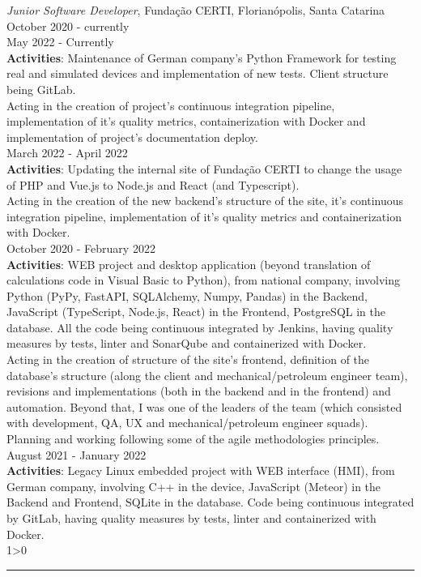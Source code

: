 \documentclass[a4paper,10pt]{article}
\newcommand{\createSection}[4][0]{
	\begin{tcolorbox}[
        blanker,
        breakable,
        title=\begin{minipage}{0.16\linewidth}\large{\textbf{#2}}\vspace{-#3\baselineskip}\end{minipage},
        coltitle=black,
        leftupper=0.21\linewidth,
    ]
        #4
		\ifnum0#1>0 { \hrule {\ } } \fi
    \end{tcolorbox}
}
\begin{document}
	\createSection[1]{Experience}{2}{
	    \textit{Junior Software Developer}, Fundação CERTI, Florianópolis, Santa Catarina \hfill October 2020 - currently \\
	    May 2022 - Currently\\
        \textbf{Activities}: Maintenance of German company's Python Framework for testing real and simulated devices and implementation of new tests. Client structure being GitLab.\\

        Acting in the creation of project's continuous integration pipeline, implementation of it's quality metrics, containerization with Docker and implementation of project's documentation deploy.\\

	    March 2022 - April 2022\\
        \textbf{Activities}: Updating the internal site of Fundação CERTI to change the usage of PHP and Vue.js to Node.js and React (and Typescript).\\

        Acting in the creation of the new backend's structure of the site, it's continuous integration pipeline, implementation of it's quality metrics and containerization with Docker.\\

        October 2020 - February 2022\\
        \textbf{Activities}: WEB project and desktop application (beyond translation of calculations code in Visual Basic to Python), from national company, involving Python (PyPy, FastAPI, SQLAlchemy, Numpy, Pandas) in the Backend, JavaScript (TypeScript, Node.js, React) in the Frontend, PostgreSQL in the database. All the code being continuous integrated by Jenkins, having quality measures by tests, linter and SonarQube and containerized with Docker.\\

        Acting in the creation of structure of the site's frontend, definition of the database's structure (along the client and mechanical/petroleum engineer team), revisions and implementations (both in the backend and in the frontend) and automation. Beyond that, I was one of the leaders of the team (which consisted with development, QA, UX and mechanical/petroleum engineer squads). Planning and working following some of the agile methodologies principles.\\

        August 2021 - January 2022\\
        \textbf{Activities}: Legacy Linux embedded project with WEB interface (HMI), from German company, involving C++ in the device, JavaScript (Meteor) in the Backend and Frontend, SQLite in the database. Code being continuous integrated by GitLab, having quality measures by tests, linter and containerized with Docker.\\

}
\end{document}
